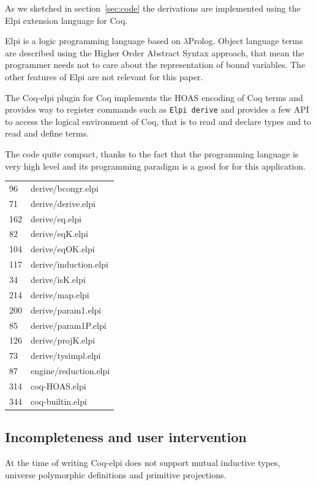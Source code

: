 \documentclass[sigplan,10pt,review]{acmart}\settopmatter{printfolios=true,printccs=false,printacmref=false}
\begin{document}
As we sketched in section~\ref{sec:code} the derivations are
implemented using the Elpi extension language for Coq.

Elpi is a logic programming language based on $\lambda$Prolog.
Object language terms are described using the Higher Order Abstract
Syntax approach, that mean the programmer needs not to care about the
representation of bound variables. The other features of Elpi
are not relevant for this paper.

The Coq-elpi plugin for Coq implements the HOAS encoding of Coq
terms and provides way to register commands such as
\lstinline+Elpi derive+ and provides a few API to access the
logical environment of Coq, that is to read and declare
types and to read and define terms.

The code quite compact, thanks to the fact that the programming
language is very high level and its programming paradigm is a good
for for this application.

\begin{tabular}{ll}
   96 & derive/bcongr.elpi\\
   71 & derive/derive.elpi\\
  162 & derive/eq.elpi\\
   82 & derive/eqK.elpi\\
  104 & derive/eqOK.elpi\\
  117 & derive/induction.elpi\\
   34 & derive/isK.elpi\\
  214 & derive/map.elpi\\
  200 & derive/param1.elpi\\
   85 & derive/param1P.elpi\\
  126 & derive/projK.elpi\\
   73 & derive/tysimpl.elpi\\
   87 & engine/reduction.elpi\\
  314 & coq-HOAS.elpi \\
  344 & coq-builtin.elpi
\end{tabular}

\subsection{Incompleteness and user intervention} %
\label{sec:oops}

At the time of writing Coq-elpi does not support mutual inductive
types, universe polymorphic definitions and primitive projections.
\end{document}
